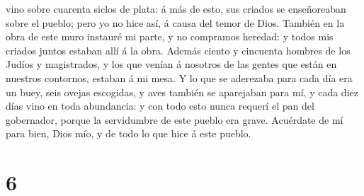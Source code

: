 vino sobre cuarenta siclos de plata: á más de esto, sus criados se
enseñoreaban sobre el pueblo; pero yo no hice así, á causa del temor de
Dios.  También en la obra de este muro instauré mi parte,
y no compramos heredad: y todos mis criados juntos estaban allí á la
obra.  Además ciento y cincuenta hombres de los Judíos y
magistrados, y los que venían á nosotros de las gentes que están en
nuestros contornos, estaban á mi mesa.  Y lo que se
aderezaba para cada día era un buey, seis ovejas escogidas, y aves
también se aparejaban para mí, y cada diez días vino en toda abundancia:
y con todo esto nunca requerí el pan del gobernador, porque la
servidumbre de este pueblo era grave.  Acuérdate de mí
para bien, Dios mío, y de todo lo que hice á este pueblo.

\hypertarget{section-5}{%
\section{6}\label{section-5}}

